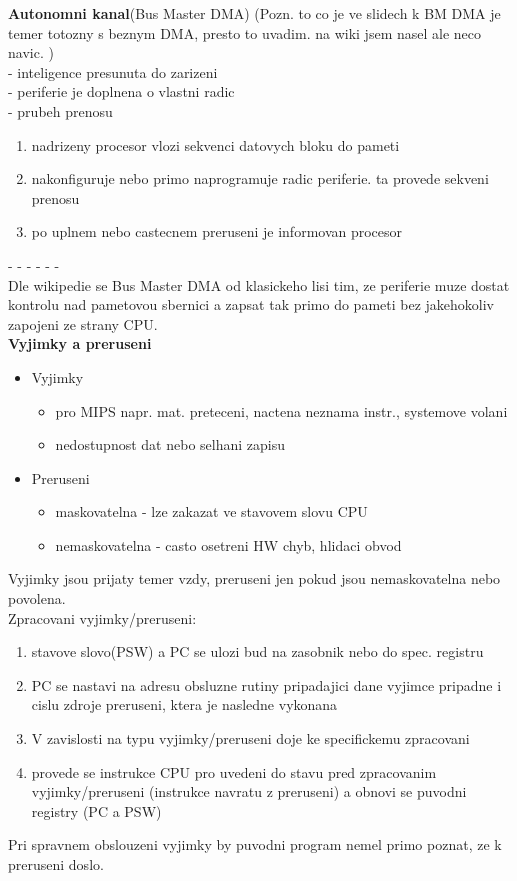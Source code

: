 \documentclass[10pt]{article}
\begin{document}
\textbf{Autonomni kanal}(Bus Master DMA)
(Pozn. to co je ve slidech k BM DMA je temer totozny s beznym DMA, presto to uvadim. na wiki jsem nasel ale neco navic. )\\
- inteligence presunuta do zarizeni\\
- periferie je doplnena o vlastni radic\\
- prubeh prenosu \begin{enumerate}
	\item nadrizeny procesor vlozi sekvenci datovych bloku do pameti
	\item nakonfiguruje nebo primo naprogramuje radic periferie. ta provede sekveni prenosu
	\item po uplnem nebo castecnem preruseni je informovan procesor
	\end{enumerate}
	- - - - - -\\
Dle wikipedie se Bus Master DMA od klasickeho lisi tim, ze periferie muze dostat kontrolu nad pametovou sbernici a zapsat tak primo do pameti bez jakehokoliv zapojeni ze strany CPU.\\

\textbf{Vyjimky a preruseni}\\
\begin{itemize}
\item Vyjimky \begin{itemize}
	\item pro MIPS napr. mat. preteceni, nactena neznama instr., systemove volani
	\item nedostupnost dat nebo selhani zapisu
	\end{itemize}
\item Preruseni \begin{itemize}
	\item maskovatelna - lze zakazat ve stavovem slovu CPU
	\item nemaskovatelna - casto osetreni HW chyb, hlidaci obvod
	\end{itemize}
\end{itemize}

Vyjimky jsou prijaty temer vzdy, preruseni jen pokud jsou nemaskovatelna nebo povolena.\\

Zpracovani vyjimky/preruseni:
\begin{enumerate}
\item stavove slovo(PSW) a PC se ulozi bud na zasobnik nebo do spec. registru
\item PC se nastavi na adresu obsluzne rutiny pripadajici dane vyjimce pripadne i cislu zdroje preruseni, ktera je nasledne vykonana
\item V zavislosti na typu vyjimky/preruseni doje ke specifickemu zpracovani
\item provede se instrukce CPU pro uvedeni do stavu pred zpracovanim vyjimky/preruseni (instrukce navratu z preruseni) a obnovi se puvodni registry (PC a PSW)
\end{enumerate}
Pri spravnem obslouzeni vyjimky by puvodni program nemel primo poznat, ze k preruseni doslo.\\
\end{document}
